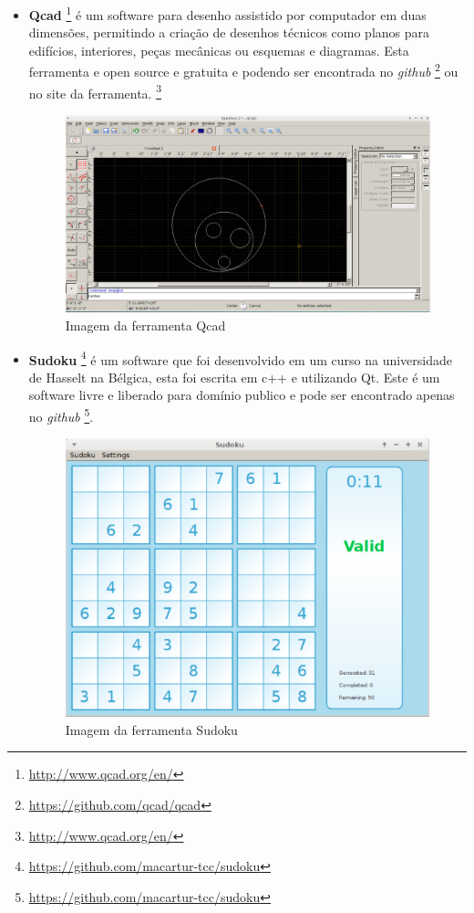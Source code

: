 \begin{itemize}
    \item \textbf{Qcad}
\footnote{\url{http://www.qcad.org/en/}} é um software para desenho
 assistido por computador em duas dimensões, permitindo a criação de desenhos técnicos como
 planos para edifícios, interiores, peças mecânicas ou esquemas e diagramas. Esta ferramenta
 e open source  e gratuita e podendo ser encontrada no \textit{github}
\footnote{\url{https://github.com/qcad/qcad}} ou no site da ferramenta.
\footnote{\url{http://www.qcad.org/en/}}

    \begin{figure}[h]
        \centering
            \includegraphics[scale=0.3]{figuras/qcad.eps}
        \caption{Imagem da ferramenta Qcad}
        \label{ferramenta_qcad}
    \end{figure}

    \item \textbf{Sudoku}
\footnote{\url{https://github.com/macartur-tcc/sudoku}} é um software que foi
 desenvolvido em um curso na universidade de Hasselt na Bélgica, esta foi escrita em c++ e utilizando Qt.
 Este é um software livre e liberado para domínio publico e pode ser encontrado apenas no \textit{github}
\footnote{\url{https://github.com/macartur-tcc/sudoku}}.

    \begin{figure}[h]
        \centering
            \includegraphics[scale=0.3]{figuras/sudoku.eps}
        \caption{Imagem da ferramenta Sudoku}
        \label{ferramenta_qcad}
    \end{figure}


\end{itemize}
